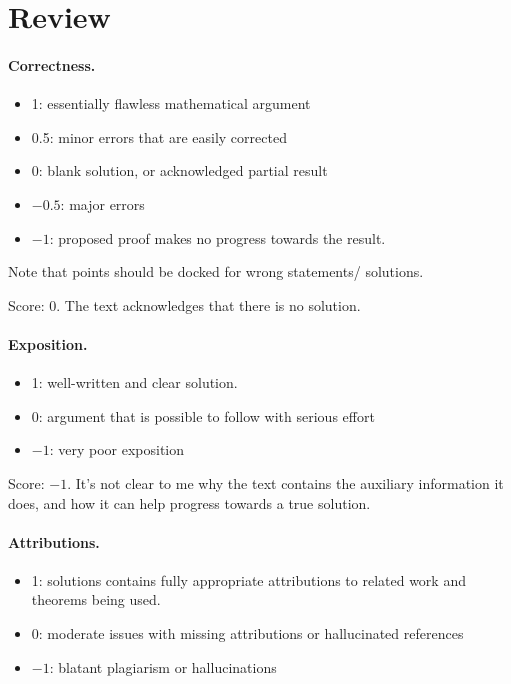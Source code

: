 \documentclass[11pt]{article}
\theoremstyle{definition}
\theoremstyle{remark}
\begin{document}
\maketitle

\section{Review}

\paragraph{Correctness.}
\begin{itemize}
	\item  1: essentially flawless mathematical argument
	\item  0.5: minor errors that are easily corrected
	\item  0: blank solution, or acknowledged partial result
	\item  $-0.5$: major errors
	\item  $-1$: proposed proof makes no progress towards the result.
\end{itemize}
Note that points should be docked for wrong statements/ solutions.

\noindent Score: 0.
The text acknowledges that there is no solution.

\paragraph{Exposition.}
\begin{itemize}
	\item  1: well-written and clear solution.
	\item  0: argument that is possible to follow with serious effort
	\item  $-1$: very poor exposition
\end{itemize}

\noindent Score: $-1$.
It's not clear to me why the text contains the auxiliary information it does, and how it can help progress towards a true solution.

\paragraph{Attributions.}
\begin{itemize}
	\item  1: solutions contains fully appropriate attributions
		to related work and theorems being used.
	\item  0: moderate issues with missing attributions or hallucinated references
	\item  $-1$: blatant plagiarism or hallucinations
\end{itemize}
\end{document}
